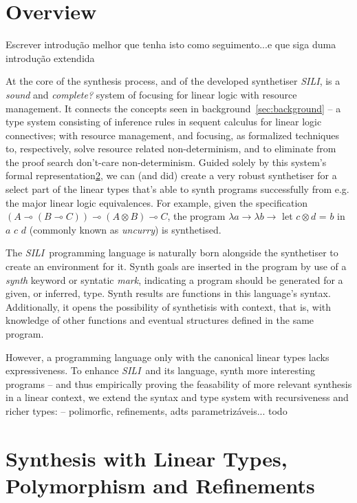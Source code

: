 \documentclass{llncs}
\newcommand{\lolli}{\multimap}
\newcommand{\tensor}{\otimes}
\newcommand{\synname}{\emph{SILI}}
\begin{document}
\section{Overview}

Escrever introdução melhor que tenha isto como seguimento...e que siga duma
introdução extendida

At the core of the synthesis process, and of the developed synthetiser \synname,
is a \emph{sound} and \emph{complete?} system of focusing for linear logic with
resource management. It connects the concepts seen in
background~\ref{sec:background} -- a type system
consisting of inference rules in sequent calculus for linear logic connectives;
with resource management, and focusing, as formalized techniques to,
respectively, solve resource related non-determinism, and to eliminate from the
proof search don't-care non-determinism.  Guided solely by this system's formal
representation\ref{sec:formal_system}, we can (and did) create a very robust
synthetiser for a select part of the linear types that's able to synth
programs successfully from e.g. the major linear logic equivalences. For example,
given the specification $(A \lolli (B \lolli C)) \lolli (A \tensor B) \lolli C$,
the program $\lambda a \rightarrow \lambda b \rightarrow$ let $c \tensor d$ =
$b$ in $a$ $c$ $d$ (commonly known as \emph{uncurry}) is synthetised.

The \synname\ programming language is naturally born alongside the synthetiser
to create an environment for it. Synth goals are inserted in the program by use
of a \emph{synth} keyword or syntatic \emph{mark}, indicating a program should
be generated for a given, or inferred, type. Synth results are functions in this
language's syntax. Additionally, it opens the possibility of synthetisis with
context, that is, with knowledge of other functions and eventual structures
defined in the same program.

However, a programming language only with the canonical linear types lacks
expressiveness. To enhance \synname\ and its language, synth more interesting
programs -- and thus empirically proving the feasability of more relevant
synthesis in a linear context, we extend the syntax and type system with
recursiveness and richer
types: -- polimorfic, refinements, adts parametrizáveis...  todo


\section{Synthesis with Linear Types, Polymorphism and Refinements}\label{sec:formal_system}
\end{document}
